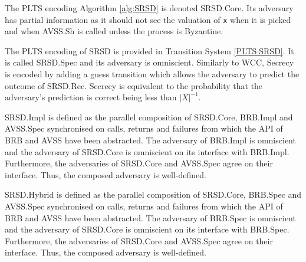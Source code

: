 \begin{definition}
    \label{SRSD:Core}

    The PLTS encoding Algorithm \ref{alg:SRSD} is denoted \textsf{SRSD.Core}.
    Its adversary has partial information as it should not see the valuation of
    \texttt{x} when it is picked and when \textsf{AVSS.Sh} is called unless the
    process is Byzantine.
\end{definition}

\begin{specification}
    \label{SRSD:Spec}

    The PLTS encoding of \textsf{SRSD} is provided in Transition System \ref{PLTS:SRSD}.
    It is called \textsf{SRSD.Spec} and its adversary is omniscient.
    Similarly to \textsf{WCC}, Secrecy is encoded by adding a guess transition which allows
    the adversary to predict the outcome of \textsf{SRSD.Rec}. Secrecy is equivalent to
    the probability that the adversary's prediction is correct being less than $|X|^{-1}$.
\end{specification}

\begin{definition}
    \label{SRSD:Impl}

    \textsf{SRSD.Impl} is defined as the parallel composition of
    \textsf{SRSD.Core}, \textsf{BRB.Impl} and \textsf{AVSS.Spec}
    synchronised on calls, returns and failures from which the
    API of \textsf{BRB} and \textsf{AVSS} have been abstracted. The adversary of \textsf{BRB.Impl}
    is omniscient and the adversary of \textsf{SRSD.Core} is omniscient on its
    interface with \textsf{BRB.Impl}. Furthermore, the adversaries of \textsf{SRSD.Core}
    and \textsf{AVSS.Spec} agree on their interface. Thus, the composed
    adversary is well-defined.
\end{definition}

\begin{definition}
    \label{SRSD:Hybrid}

    \textsf{SRSD.Hybrid} is defined as the parallel composition of
    \textsf{SRSD.Core}, \textsf{BRB.Spec} and \textsf{AVSS.Spec}
    synchronised on calls, returns and failures from which the
    API of \textsf{BRB} and \textsf{AVSS} have been abstracted. The adversary of \textsf{BRB.Spec}
    is omniscient and the adversary of \textsf{SRSD.Core} is omniscient on its
    interface with \textsf{BRB.Spec}. Furthermore, the adversaries of \textsf{SRSD.Core}
    and \textsf{AVSS.Spec} agree on their interface. Thus, the composed
    adversary is well-defined.
\end{definition}


